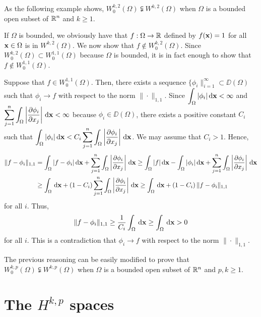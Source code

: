 \begin{egg}
As the following example shows,
$\displaystyle W^{k,2}_0(\Omega) \subsetneqq W^{k,2}(\Omega)$ when $\Omega$ is a
bounded open subset of $\displaystyle \mathbb{R}^n$ and $k\geq 1$.

If $\Omega$ is bounded, we obviously have that $f:\Omega \to \mathbb{R}$
defined by $f(\mathbf{x}) = 1$ for all $\mathbf{x} \in \Omega$ is in 
$\displaystyle W^{k,2}(\Omega)$.  We now show that
$\displaystyle f \not\in W_0^{k,2}(\Omega)$.  Since
$\displaystyle W_0^{k,2}(\Omega) \subset W_0^{1,1}(\Omega)$ because
$\Omega$ is bounded, it is in fact enough to
show that $\displaystyle f \not\in W_0^{1,1}(\Omega)$.

Suppose that $\displaystyle f \in W_0^{1,1}(\Omega)$.  Then, there
exists a sequence
$\displaystyle \{\phi_i\|_{i=1}^\infty \subset \DD(\Omega)$ such that
$\phi_i \to f$ with respect to the norm $\|\cdot\|_{1,1}$.
Since $\displaystyle \int_{\Omega} |\phi_i| \,\mathrm{d}{\mathbf{x}} < \infty$ and
$\displaystyle \sum_{j=1}^n \int_{\Omega} \left| \frac{\partial{\phi_i}}{\partial x_j}
\right| \,\mathrm{d}{\mathbf{x}} < \infty$ because
$\displaystyle \phi_i \in \DD(\Omega)$, there exists a positive constant $C_i$
such that
$\displaystyle \int_{\Omega} |\phi_i| \,\mathrm{d}{\mathbf{x}} < C_i
\sum_{j=1}^n \int_{\Omega} \left| \frac{\partial{\phi_i}}{\partial x_j}
\right| \,\mathrm{d}{\mathbf{x}}$.
We may assume that $C_i > 1$.
Hence,
\begin{align*}
\|f - \phi_i\|_{1,1}
&= \int_{\Omega} |f-\phi_i| \,\mathrm{d}{\mathbf{x}} + \sum_{j=1}^n \int_{\Omega}
\left| \frac{\partial{\phi_i}}{\partial x_j} \right| \,\mathrm{d}{\mathbf{x}}
\geq \int_{\Omega} |f| \,\mathrm{d}{\mathbf{x}} - \int_{\Omega} |\phi_i| \,\mathrm{d}{\mathbf{x}}
+ \sum_{j=1}^n \int_{\Omega}
\left| \frac{\partial{\phi_i}}{\partial x_j} \right| \,\mathrm{d}{\mathbf{x}} \\
&\geq \int_{\Omega} \,\mathrm{d}{\mathbf{x}} + \left( 1- C_i\right)
\sum_{j=1}^n \int_{\Omega} \left| \frac{\partial{\phi_i}}{\partial x_j} \right| \,\mathrm{d}{\mathbf{x}}
\geq \int_{\Omega} \,\mathrm{d}{\mathbf{x}} + \left(1 - C_i\right)
\|f - \phi_i\|_{1,1}
\end{align*}
for all $i$.  Thus,
\[
\|f - \phi_i\|_{1,1} \geq \frac{1}{C_i} \int_{\Omega} \,\mathrm{d}{\mathbf{x}}
\geq \int_{\Omega} \,\mathrm{d}{\mathbf{x}} >  0
\]
for all $i$.  This is a contradiction that
$\phi_i \to f$ with respect to the norm $\|\cdot\|_{1,1}$.

The previous reasoning can be easily modified to prove that
$\displaystyle W^{k,p}_0(\Omega) \subsetneqq W^{k,p}(\Omega)$ when $\Omega$ is a
bounded open subset of $\mathbb{R}^n$ and $p,k\geq 1$.
\end{egg}

\section{The $\displaystyle H^{k,p}$ spaces} \label{WequalH}

